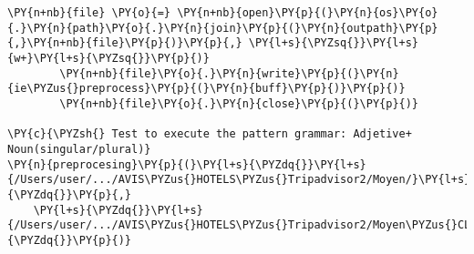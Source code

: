 \begin{Verbatim}[frame=single,commandchars=\\\{\}]
        \PY{n+nb}{file} \PY{o}{=} \PY{n+nb}{open}\PY{p}{(}\PY{n}{os}\PY{o}{.}\PY{n}{path}\PY{o}{.}\PY{n}{join}\PY{p}{(}\PY{n}{outpath}\PY{p}{,}\PY{n+nb}{file}\PY{p}{)}\PY{p}{,} \PY{l+s}{\PYZsq{}}\PY{l+s}{w+}\PY{l+s}{\PYZsq{}}\PY{p}{)}
        \PY{n+nb}{file}\PY{o}{.}\PY{n}{write}\PY{p}{(}\PY{n}{ie\PYZus{}preprocess}\PY{p}{(}\PY{n}{buff}\PY{p}{)}\PY{p}{)}
        \PY{n+nb}{file}\PY{o}{.}\PY{n}{close}\PY{p}{(}\PY{p}{)}

\PY{c}{\PYZsh{} Test to execute the pattern grammar: Adjetive+ Noun(singular/plural)}
\PY{n}{preprocesing}\PY{p}{(}\PY{l+s}{\PYZdq{}}\PY{l+s}{/Users/user/.../AVIS\PYZus{}HOTELS\PYZus{}Tripadvisor2/Moyen/}\PY{l+s}{\PYZdq{}}\PY{p}{,}
    \PY{l+s}{\PYZdq{}}\PY{l+s}{/Users/user/.../AVIS\PYZus{}HOTELS\PYZus{}Tripadvisor2/Moyen\PYZus{}CLEAN/}\PY{l+s}{\PYZdq{}}\PY{p}{)}
\end{Verbatim}